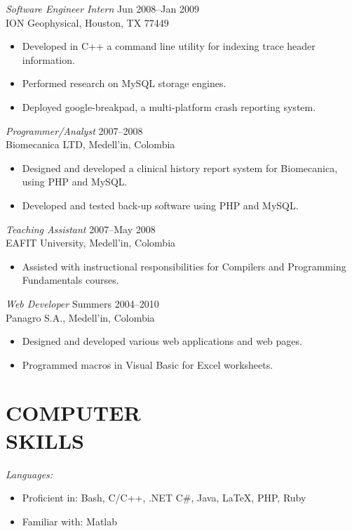 \documentclass[line,margin]{res}
\begin{document}
\begin{resume}
{\sl Software Engineer Intern} \hfill Jun 2008--Jan 2009\\
ION Geophysical, Houston, TX 77449
\begin{itemize} \itemsep -2pt
    \item Developed in C++ a command line utility for indexing trace header information.
    \item Performed research on MySQL storage engines.
    \item Deployed google-breakpad, a multi-platform crash reporting system.
\end{itemize}

{\sl Programmer/Analyst} \hfill 2007--2008\\
Biomecanica LTD, Medell\a'in, Colombia
\begin{itemize} \itemsep -2pt
    \item Designed and developed a clinical history report system for Biomecanica, using PHP and MySQL.
    \item Developed and tested back-up software using PHP and MySQL.
\end{itemize}

{\sl Teaching Assistant} \hfill 2007--May 2008\\
EAFIT University, Medell\a'in, Colombia
\begin{itemize} \itemsep -2pt
    \item  Assisted with instructional responsibilities for Compilers and Programming Fundamentals courses.
\end{itemize}

{\sl Web Developer} \hfill Summers  2004--2010\\
Panagro S.A., Medell\a'in, Colombia
\begin{itemize} \itemsep -2pt
    \item Designed and developed various web applications and web pages.  
    \item Programmed macros in Visual Basic for Excel worksheets.
\end{itemize}

 
\section{ COMPUTER \\ SKILLS} %
\label{sec:computer_skills}
    {\sl Languages:}
    \begin{itemize} \itemsep -2pt
        \item Proficient in: Bash, C/C++, .NET C\#, Java, \LaTeX, PHP, Ruby
        \item Familiar with: Matlab
    \end{itemize}


\end{resume}
\end{document}
